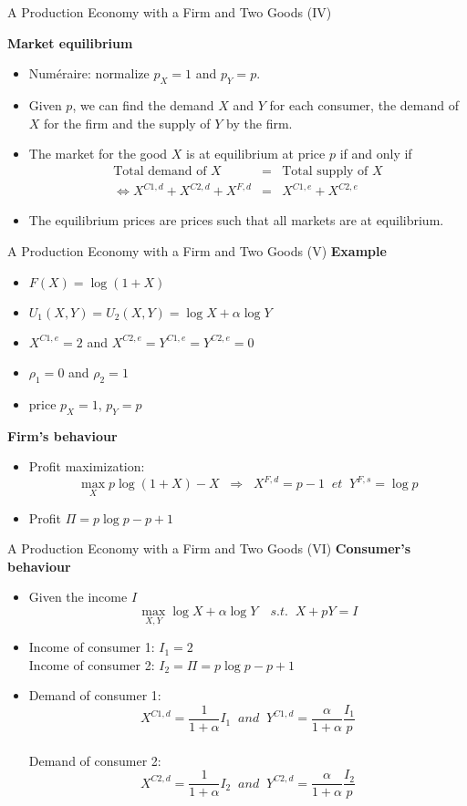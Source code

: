 \documentclass[handout]{beamer}
\newenvironment{iPar}[1]{\textbf{#1} \begin{itemize}}{\end{itemize}}
\newcommand{\mdp}{\medskip \pause}
\begin{document}
\begin{frame}{A Production Economy with a Firm and Two Goods (IV)}

\begin{iPar}{Market equilibrium} \item Numéraire: normalize
$p_{X} = 1$ and $p_{Y} = p$. \item Given $p$, we can find the demand $X$
and $Y$ for each consumer, the demand of $X$ for the firm and the supply of $Y$
by the firm.

\item The market for the good $X$ is at equilibrium at price $p$
if and only if \begin{eqnarray*}  \textrm{Total demand of } X &=&
\textrm{Total supply of } X  \\ \iff X^{C1,d} + X^{C2,d} + X^{F,d} &=&
X^{C1,e} + X^{C2,e}  \end{eqnarray*} \item The equilibrium prices are prices such that all markets are at equilibrium. \end{iPar}
\end{frame}

\begin{frame}{A Production Economy with a Firm and Two Goods (V)}
\begin{iPar}{Example} \item  $F(X) =  \log(1+X)$ \item $U_1(X,Y) =
U_2(X,Y) = \log X + \alpha \log Y$ \item $X^{C1,e} = 2$ and $X^{C2,e} =
Y^{C1,e} = Y^{C2,e} = 0$ \item $\rho_1 =0 $ and $\rho_2 = 1$ \item price
$p_X = 1$, $p_Y = p$ \end{iPar} \mdp \begin{iPar}{Firm's behaviour} \item
Profit maximization: $$\max_X p\log(1+X) - X\;\; \Rightarrow \;\; X^{F,d}
= p- 1 \;\; et \;\; Y^{F,s} = \log p$$ \item Profit $\Pi = p \log p - p
+1 $\end{iPar}

\end{frame}

\begin{frame}{A Production Economy with a Firm and Two Goods (VI)}
\begin{iPar}{Consumer's behaviour} \item<1-> Given the income $I$ $$\max_{X,Y}
\log X + \alpha \log Y \quad s.t.\;\; X + pY = I$$ \item<2-> Income of consumer 1: $I_1 = 2$ \\ \medskip Income of consumer 2: $I_2 = \Pi =  p \log
p - p +1$ \item<3-> Demand of consumer 1: $$X^{C1,d} = \frac{1}{1+\alpha}
I_1 \;\; and \;\; Y^{C1,d} = \frac{\alpha}{1+\alpha} \frac{I_1}{p}$$ \\
\medskip Demand of consumer 2: $$X^{C2,d} = \frac{1}{1+\alpha} I_2 \;\; and
\;\; Y^{C2,d} = \frac{\alpha}{1+\alpha} \frac{I_2}{p}$$ \end{iPar}

\end{frame}
\end{document}
